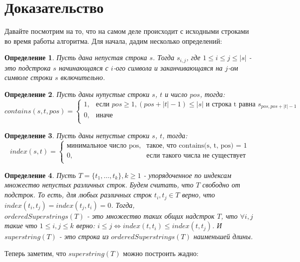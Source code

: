 \documentclass[a4paper,10pt]{article}
\newtheorem{definition}{Определение}
\begin{document}
\section{Доказательство}
Давайте посмотрим на то, что на самом деле происходит с исходными строками во время работы алгоритма.
Для начала, дадим несколько определений:

\begin{definition}
Пусть дана непустая строка $s$. 
Тогда $s_{i,j}$, где $1 \leq i \leq j \leq |s|$ - это подстрока $s$ начинающаяся с $i$-ого символа и заканчивающаяся на $j$-ом символе строки $s$ включительно.
\end{definition}

\begin{definition}
Пусть даны нупустые строки $s$, $t$ и число $pos$, тогда:
\[
	contains(s, t, pos) = 
	\left\{ 
		\begin{array}{lcl}
			1, & \mbox{если } pos \geq 1, (pos + |t| - 1) \leq |s| \mbox{ и строка t равна } s_{pos, pos + |t| - 1}\\
			0, & \mbox{иначе}\\ 
		\end{array} 
	\right.
\]
\end{definition}

\begin{definition}
Пусть даны непустые строки $s$, $t$, тогда:
\[
	index(s, t) = 
	\left\{ 
		\begin{array}{lcl}
			\mbox{минимальное число pos}, & \mbox{такое, что contains(s, t, pos) = 1}\\
			0, & \mbox{если такого числа не существует}\\ 
		\end{array} 
	\right.
\]
\end{definition}

\begin{definition}
Пусть $T = \{t_1,\dots,t_k\}, k \geq 1$ - упорядоченное по индексам множество непустых различных строк.
Будем считать, что $T$ свободно от подстрок. 
То есть, для любых различных строк $t_i,t_j \in T$ верно, что $index(t_i, t_j) = index(t_j, t_i) = 0$.
Тогда, \\
$orderedSuperstrings(T)$ - это множество таких общих надстрок $T$, 
что $\forall i,j$ такие что $1 \leq i,j \leq k$ верно: $i \leq j \iff index(t, t_i) \leq index(t, t_j)$.
И $superstring(T)$ - это строка из $orderedSuperstrings(T)$ наименьшей длины.
\end{definition}

Теперь заметим, что $superstring(T)$ можно построить жадно:
\end{document}
